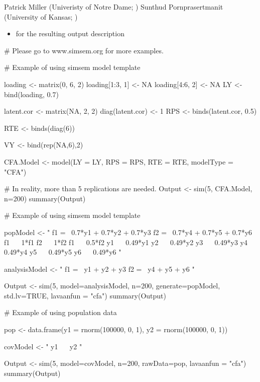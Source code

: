 \documentclass[a4paper]{book}
\begin{document}
%
\begin{Author}\relax
Patrick Miller (Univeristy of Notre Dame; )
Sunthud Pornprasertmanit (University of Kansas; )
\end{Author}
%
\begin{SeeAlso}\relax
\begin{itemize}

\item {} for the resulting output description

\end{itemize}

\end{SeeAlso}
%
\begin{Examples}
\begin{ExampleCode}
# Please go to www.simsem.org for more examples.

# Example of using simsem model template

loading <- matrix(0, 6, 2)
loading[1:3, 1] <- NA
loading[4:6, 2] <- NA
LY <- bind(loading, 0.7)

latent.cor <- matrix(NA, 2, 2)
diag(latent.cor) <- 1
RPS <- binds(latent.cor, 0.5)

RTE <- binds(diag(6))

VY <- bind(rep(NA,6),2)

CFA.Model <- model(LY = LY, RPS = RPS, RTE = RTE, modelType = "CFA")

# In reality, more than 5 replications are needed.
Output <- sim(5, CFA.Model, n=200)
summary(Output)

# Example of using simsem model template

popModel <- "
f1 =~ 0.7*y1 + 0.7*y2 + 0.7*y3
f2 =~ 0.7*y4 + 0.7*y5 + 0.7*y6
f1 ~~ 1*f1
f2 ~~ 1*f2
f1 ~~ 0.5*f2
y1 ~~ 0.49*y1
y2 ~~ 0.49*y2
y3 ~~ 0.49*y3
y4 ~~ 0.49*y4
y5 ~~ 0.49*y5
y6 ~~ 0.49*y6
"

analysisModel <- "
f1 =~ y1 + y2 + y3
f2 =~ y4 + y5 + y6
"

Output <- sim(5, model=analysisModel, n=200, generate=popModel, std.lv=TRUE, lavaanfun = "cfa")
summary(Output)

# Example of using population data

pop <- data.frame(y1 = rnorm(100000, 0, 1), y2 = rnorm(100000, 0, 1))

covModel <- "
y1 ~~ y2
"

Output <- sim(5, model=covModel, n=200, rawData=pop, lavaanfun = "cfa")
summary(Output)


\end{ExampleCode}
\end{Examples}
\end{document}
